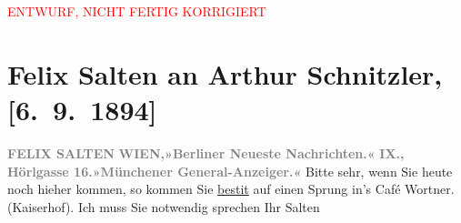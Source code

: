 
\begin{center}
            \textcolor{red}{ENTWURF, NICHT FERTIG KORRIGIERT}
                      \end{center}
            
         \renewcommand{\erwaehnteInstitutionen}{Institutionen: Berliner Neueste Nachrichten, Münchener General-Anzeiger}
         \renewcommand{\erwaehnteOrte}{Orte: Café Kaiserhof (Inh. Johann Wortner), Hörlgasse, Wien}
         \renewcommand{\erwaehnteWerke}{}
               \section[Felix Salten an Arthur Schnitzler, {[}6. 9. 1894{]}]{ Felix Salten an Arthur Schnitzler, {[}6. 9. 1894{]}}\nopagebreak{}\rehead{ }\begin{ledgroupsized}[t]{13cm}\normalsize\beginnumbering \toendnotes[C]{\smallbreak\pagebreak[2]} 
\pstart
           \noindent{}{\pb}\textcolor{gray}{\textbf{FELIX SALTEN}}\pend
           \pstart
           \textcolor{gray}{\textbf{WIEN,}}\hfill \textcolor{gray}{\textbf{»Berliner Neueste
                        Nachrichten.«}}\pend
           \pstart
           \textcolor{gray}{\textbf{IX., Hörlgasse 16.}}\hfill \textcolor{gray}{\textbf{»Münchener
                        General-Anzeiger.«}}\pend
           \pstart
           {\pb}Bitte sehr, wenn Sie heute noch
               hieher kommen, so kommen Sie \uline{besti{\geminationm}t} auf einen Sprung in’s Café Wortner. (Kaiserhof). Ich muss Sie notwendig sprechen\pend
           \pstart Ihr \spacefill\mbox{Salten}\pend{}
         
         \endnumbering{}\end{ledgroupsized}\begin{anhang}\end{anhang}\newcommand{\dateiname}{L03144}\newcommand{\titel}{Felix Salten an Arthur Schnitzler, [6. 9. 1894]}\newcommand{\editorInnen}{Martin Anton Müller und Laura Untner}
      